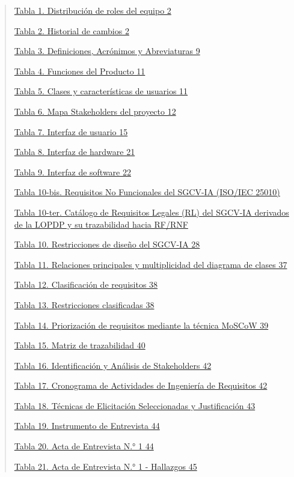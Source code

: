 \documentclass[
]{article}
\begin{document}
\begin{quote}
\hyperref[_bookmark1]{Tabla 1. Distribución de roles del equipo 2}

\hyperref[_bookmark2]{Tabla 2. Historial de cambios 2}

\hyperref[_bookmark8]{Tabla 3. Definiciones, Acrónimos y Abreviaturas 9}

\hyperref[_bookmark15]{Tabla 4. Funciones del Producto 11}

\hyperref[_bookmark17]{Tabla 5. Clases y características de usuarios 11}

\hyperref[_bookmark19]{Tabla 6. Mapa Stakeholders del proyecto 12}

\hyperref[_bookmark24]{Tabla 7. Interfaz de usuario 15}

\hyperref[table8]{Tabla 8. Interfaz de hardware 21}

\hyperref[tabla-9.-interfaz-de-software]{Tabla 9. Interfaz de software 22}

\hyperref[_bookmark41b]{Tabla 10-bis. Requisitos No Funcionales del SGCV-IA (ISO/IEC 25010)}

\hyperref[_bookmark41c]{Tabla 10-ter. Catálogo de Requisitos Legales (RL) del SGCV-IA derivados de la LOPDP y su trazabilidad hacia RF/RNF}

\hyperref[table10]{Tabla 10. Restricciones de diseño del SGCV-IA 28}

\hyperref[table11]{Tabla 11. Relaciones principales y multiplicidad del diagrama de clases 37}

\hyperref[table12]{Tabla 12. Clasificación de requisitos 38}

\hyperref[table13]{Tabla 13. Restricciones clasificadas 38}

\hyperref[_bookmark64]{Tabla 14. Priorización de requisitos mediante la técnica MoSCoW 39}

\hyperref[_bookmark66]{Tabla 15. Matriz de trazabilidad 40}

\hyperref[_bookmark70]{Tabla 16. Identificación y Análisis de Stakeholders 42}

\hyperref[_bookmark72]{Tabla 17. Cronograma de Actividades de Ingeniería de Requisitos 42}

\hyperref[_bookmark74]{Tabla 18. Técnicas de Elicitación Seleccionadas y Justificación 43}

\hyperref[_bookmark77]{Tabla 19. Instrumento de Entrevista 44}

\hyperref[_bookmark79]{Tabla 20. Acta de Entrevista N.° 1 44}

\hyperref[_bookmark80]{Tabla 21. Acta de Entrevista N.° 1 - Hallazgos 45}


\end{quote}
\end{document}
